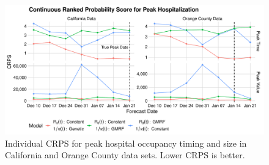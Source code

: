 \begin{figure}
    \centering
    \includegraphics[width=1.0\columnwidth]{real_data_peak_crps_plot}
    \caption[Individual CRPS for peak hospital occupancy in real data sets.]{Individual CRPS for peak hospital occupancy timing and size in California and Orange County data sets. Lower CRPS is better.}
    \label{ch_5:fig:real_data_peak_crps_plot}
\end{figure}

\label{ch_5:sec:real_cases_icu_death}

